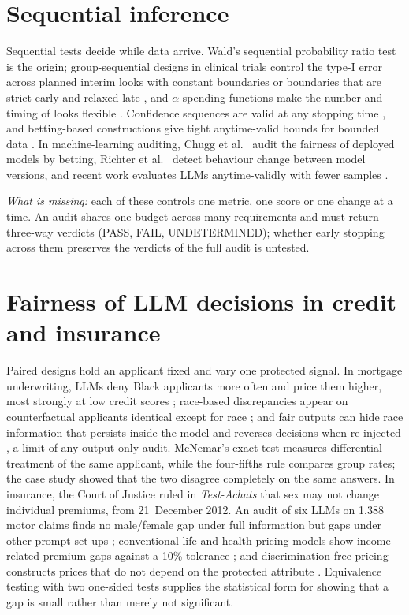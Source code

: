 \section{Sequential inference}
Sequential tests decide while data arrive. Wald's sequential probability ratio test \citep{wald1945} is the origin; group-sequential designs in clinical trials control the type-I error across planned interim looks with constant boundaries \citep{pocock1977} or boundaries that are strict early and relaxed late \citep{obrien1979}, and $\alpha$-spending functions make the number and timing of looks flexible \citep{landemets}. Confidence sequences are valid at any stopping time \citep{howard}, and betting-based constructions give tight anytime-valid bounds for bounded data \citep{waudbysmith2024}. In machine-learning auditing, Chugg et al.\ \citep{chugg2023} audit the fairness of deployed models by betting, Richter et al.\ \citep{richter2025} detect behaviour change between model versions, and recent work evaluates LLMs anytime-validly with fewer samples \citep{celeus2026,hsu2026}.

\emph{What is missing:} each of these controls one metric, one score or one change at a time. An audit shares one budget across many requirements and must return three-way verdicts (PASS, FAIL, UNDETERMINED); whether early stopping across them preserves the verdicts of the full audit is untested.

\section{Fairness of LLM decisions in credit and insurance}
Paired designs hold an applicant fixed and vary one protected signal. In mortgage underwriting, LLMs deny Black applicants more often and price them higher, most strongly at low credit scores \citep{bowen}; race-based discrepancies appear on counterfactual applicants identical except for race \citep{cook2025}; and fair outputs can hide race information that persists inside the model and reverses decisions when re-injected \citep{tripathy2026}, a limit of any output-only audit. McNemar's exact test \citep{mcnemar} measures differential treatment of the same applicant, while the four-fifths rule \citep{eeoc} compares group rates; the case study showed that the two disagree completely on the same answers. In insurance, the Court of Justice ruled in \emph{Test-Achats} \citep{testachats} that sex may not change individual premiums, from 21~December 2012. An audit of six LLMs on 1{,}388 motor claims finds no male/female gap under full information but gaps under other prompt set-ups \citep{huang2026binary}; conventional life and health pricing models show income-related premium gaps against a 10\% tolerance \citep{gupta2025}; and discrimination-free pricing constructs prices that do not depend on the protected attribute \citep{lindholm2022}. Equivalence testing with two one-sided tests \citep{schuirmann1987} supplies the statistical form for showing that a gap is small rather than merely not significant.

